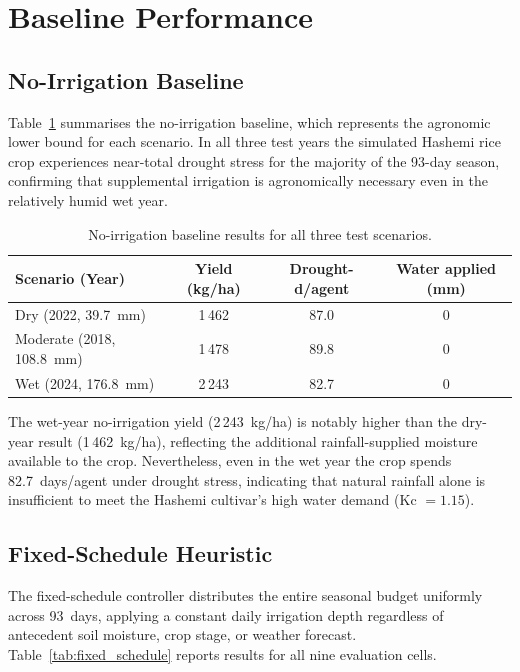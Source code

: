 \section{Baseline Performance}
\label{sec:baseline}

\subsection{No-Irrigation Baseline}

Table~\ref{tab:no_irrigation} summarises the no-irrigation baseline, which represents the
agronomic lower bound for each scenario.  In all three test years the simulated Hashemi
rice crop experiences near-total drought stress for the majority of the 93-day season,
confirming that supplemental irrigation is agronomically necessary even in the relatively
humid wet year.

\begin{table}[ht]
\centering
\caption{No-irrigation baseline results for all three test scenarios.}
\label{tab:no_irrigation}
\begin{tabular}{lccc}
\hline
\textbf{Scenario (Year)} & \textbf{Yield (kg/ha)} & \textbf{Drought-d/agent} & \textbf{Water applied (mm)} \\
\hline
Dry   (2022, 39.7~mm)   & 1\,462 & 87.0 & 0 \\
Moderate (2018, 108.8~mm) & 1\,478 & 89.8 & 0 \\
Wet   (2024, 176.8~mm)   & 2\,243 & 82.7 & 0 \\
\hline
\end{tabular}
\end{table}

The wet-year no-irrigation yield (2\,243~kg/ha) is notably higher than the dry-year result
(1\,462~kg/ha), reflecting the additional rainfall-supplied moisture available to the crop.
Nevertheless, even in the wet year the crop spends 82.7~days/agent under drought stress,
indicating that natural rainfall alone is insufficient to meet the Hashemi cultivar's
high water demand (Kc $= 1.15$).

\subsection{Fixed-Schedule Heuristic}

The fixed-schedule controller distributes the entire seasonal budget uniformly across
93~days, applying a constant daily irrigation depth regardless of antecedent soil
moisture, crop stage, or weather forecast.  Table~\ref{tab:fixed_schedule} reports
results for all nine evaluation cells.

